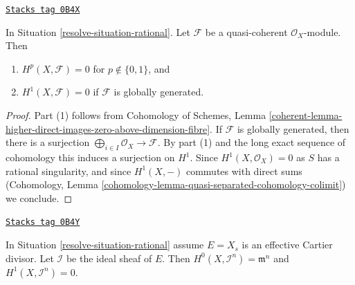 \begin{lemma}
\label{resolve-lemma-globally-generated}
\href{https://stacks.math.columbia.edu/tag/0B4X}{\texttt{Stacks tag 0B4X}}

In Situation \ref{resolve-situation-rational}.
Let $\mathcal{F}$ be a quasi-coherent $\mathcal{O}_X$-module. Then
\begin{enumerate}
\item $H^p(X, \mathcal{F}) = 0$ for $p \not \in \{0, 1\}$, and
\item $H^1(X, \mathcal{F}) = 0$ if $\mathcal{F}$ is globally generated.
\end{enumerate}
\end{lemma}

\begin{proof}
Part (1) follows from  Cohomology of Schemes, Lemma
\ref{coherent-lemma-higher-direct-images-zero-above-dimension-fibre}.
If $\mathcal{F}$ is globally generated, then there is a surjection
$\bigoplus_{i \in I} \mathcal{O}_X \to \mathcal{F}$. By part (1)
and the long exact sequence of cohomology this
induces a surjection on $H^1$. Since $H^1(X, \mathcal{O}_X) = 0$
as $S$ has a rational singularity, and since $H^1(X, -)$ commutes
with direct sums
(Cohomology, Lemma \ref{cohomology-lemma-quasi-separated-cohomology-colimit})
we conclude.
\end{proof}

\begin{lemma}
\label{resolve-lemma-sections-powers-I-rational}
\href{https://stacks.math.columbia.edu/tag/0B4Y}{\texttt{Stacks tag 0B4Y}}

In Situation \ref{resolve-situation-rational} assume
$E = X_s$ is an effective Cartier divisor.
Let $\mathcal{I}$ be the ideal sheaf of $E$. Then
$H^0(X, \mathcal{I}^n) = \mathfrak m^n$ and
$H^1(X, \mathcal{I}^n) = 0$.
\end{lemma}


